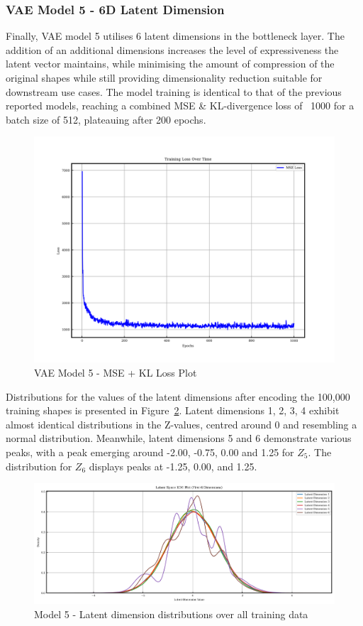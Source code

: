 \documentclass{article}
\begin{document}
\subsubsection{VAE Model 5 - 6D Latent Dimension}

Finally, VAE model 5 utilises 6 latent dimensions in the bottleneck layer. The addition of an additional dimensions increases the level of expressiveness the latent vector maintains, while minimising the amount of compression of the original shapes while still providing dimensionality reduction suitable for downstream use cases. The model training is identical to that of the previous reported models, reaching a combined MSE \& KL-divergence loss of ~1000 for a batch size of 512, plateauing after 200 epochs.

\begin{figure}[H]
\centering
    \includegraphics[width=0.75\linewidth]{figures/VAEmodels/model5/loss_plot.png}
    \caption{VAE Model 5 - MSE + KL Loss Plot}
    \label{fig:model5_loss_plot}
\end{figure}

Distributions for the values of the latent dimensions after encoding the 100,000 training shapes is presented in Figure~\ref{fig:model5_latent_dist}. Latent dimensions 1, 2, 3, 4 exhibit almost identical distributions in the Z-values, centred around 0 and resembling a normal distribution. Meanwhile, latent dimensions 5 and 6 demonstrate various peaks, with a peak emerging around -2.00, -0.75, 0.00 and 1.25 for $Z_5$. The distribution for $Z_6$ displays peaks at -1.25, 0.00, and 1.25.

\begin{figure}[H]
    \centering
    \includegraphics[width=0.75\linewidth]{figures/VAEmodels/model5/latent_distribution.png}
    \caption{Model 5 - Latent dimension distributions over all training data}
    \label{fig:model5_latent_dist}
\end{figure}
\end{document}
